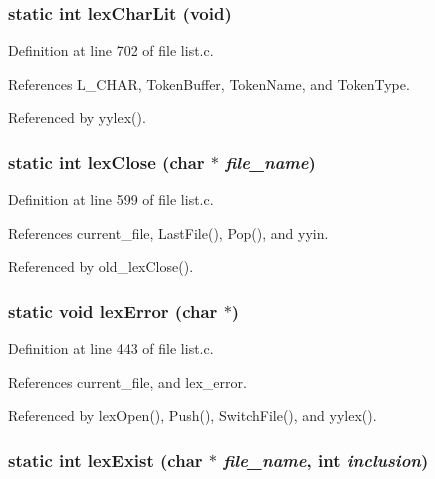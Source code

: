 \subsubsection{\setlength{\rightskip}{0pt plus 5cm}static int lex\-Char\-Lit (void)\hspace{0.3cm}{\tt  [static]}}\label{list_8c_f3210843f5cc57eda44b272601a0c0fa}




Definition at line 702 of file list.c.

References L\_\-CHAR, Token\-Buffer, Token\-Name, and Token\-Type.

Referenced by yylex().
\subsubsection{\setlength{\rightskip}{0pt plus 5cm}static int lex\-Close (char $\ast$ {\em file\_\-name})\hspace{0.3cm}{\tt  [static]}}\label{list_8c_51814ae811f4e5f86d669f8fa92f630e}




Definition at line 599 of file list.c.

References current\_\-file, Last\-File(), Pop(), and yyin.

Referenced by old\_\-lex\-Close().
\subsubsection{\setlength{\rightskip}{0pt plus 5cm}static void lex\-Error (char $\ast$)\hspace{0.3cm}{\tt  [static]}}\label{list_8c_195af11d4c5e4c090938429100b952e1}




Definition at line 443 of file list.c.

References current\_\-file, and lex\_\-error.

Referenced by lex\-Open(), Push(), Switch\-File(), and yylex().
\subsubsection{\setlength{\rightskip}{0pt plus 5cm}static int lex\-Exist (char $\ast$ {\em file\_\-name}, int {\em inclusion})\hspace{0.3cm}{\tt  [static]}}\label{list_8c_9e2315c508005bbb2a721bced909ddd0}




